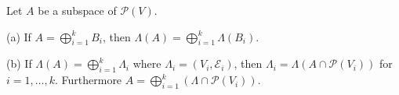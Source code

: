 Let $A$ be a subspace of $\mathcal{P}(V)$.

(a) If $A = \bigoplus_{i=1}^{k} B_i$, then $\Lambda(A) = \bigoplus_{i=1}^{k} \Lambda(B_i)$.

(b) If $\Lambda(A) = \bigoplus_{i=1}^{k} \Lambda_i$ where $\Lambda_i = (V_i, \mathcal{E}_i)$, then $\Lambda_i = \Lambda(A \cap \mathcal{P}(V_i))$ for $i = 1, \ldots, k$. Furthermore $A = \bigoplus_{i=1}^{k} (\Lambda \cap \mathcal{P}(V_i))$.
